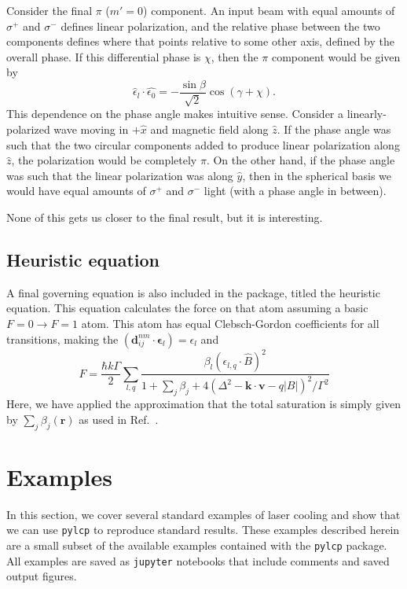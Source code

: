 \documentclass[final,5p,times,twocolumn]{elsarticle}
\begin{document}
Consider the final $\pi$ ($m'=0$) component.  An input beam with equal amounts
of $\sigma^+$ and $\sigma^-$  defines linear polarization, and the relative
phase between the two components defines where that points relative to some
other axis, defined by the overall  phase.  If this differential phase is
$\chi$, then the $\pi$ component would be given by
\begin{equation}
  \hat{\epsilon}_l\cdot\hat{\epsilon_0} = -\frac{\sin\beta}{\sqrt{2}}
  \cos(\gamma+\chi).
\end{equation}
This dependence on the phase angle makes intuitive sense.  Consider a
linearly-polarized wave moving in $+\hat{x}$ and magnetic field along $\hat{z}$.
If the phase angle was such that the two circular components added to produce
linear polarization along $\hat{z}$, the polarization would be completely $\pi$.
On the other hand, if the phase angle was such that the linear polarization was
along $\hat{y}$, then in the spherical basis we would have equal amounts of
$\sigma^+$ and $\sigma^-$ light (with a phase angle in between).

None of this gets us closer to the final result, but it is interesting.

\subsection{Heuristic equation}
A final governing equation is also included in the package, titled the heuristic equation.  This equation calculates the force on that atom assuming a basic $F=0\rightarrow F=1$ atom.  This atom has equal Clebsch-Gordon coefficients for all transitions, making the $(\mathbf{d}_{ij}^{nm}\cdot \boldsymbol{\epsilon}_l) = \epsilon_l$ and
\begin{equation}
	F = \frac{\hbar k \Gamma}{2}\sum_{l,q} \frac{\beta_l \left(\epsilon_{l,q}\cdot \hat{B}\right)^2}{1+\sum_j\beta_j+4(\Delta^2 - \mathbf{k}\cdot\mathbf{v} - q |B|)^2/\Gamma^2} 
\end{equation}
Here, we have applied the approximation that the total saturation is simply given by $\sum_j \beta_j(\mathbf{r})$ as used in Ref.~\cite{Lett1989}.

\section{Examples}
\label{sec:examples}
In this section, we cover several standard examples of laser cooling and show that we can use {\tt pylcp} to reproduce standard results.  These examples described herein are a small subset of the available examples contained with the {\tt pylcp} package.  All examples are saved as {\tt jupyter} notebooks that include comments and saved output figures.
\end{document}

